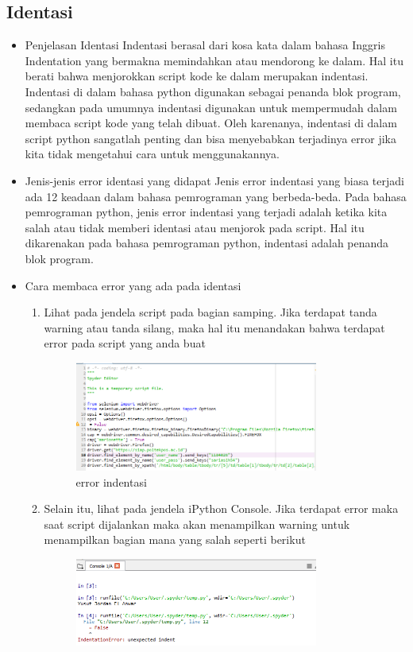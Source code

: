 \begin{enumerate}
\section{Identasi}
\begin{itemize}
	\item Penjelasan Identasi
		Indentasi berasal dari kosa kata dalam bahasa Inggris Indentation yang bermakna memindahkan atau mendorong ke dalam. Hal itu berati bahwa menjorokkan script kode ke dalam merupakan indentasi. Indentasi di dalam bahasa python digunakan sebagai penanda blok program, sedangkan pada umumnya indentasi digunakan untuk mempermudah dalam membaca script kode yang telah dibuat. Oleh karenanya, indentasi di dalam script python sangatlah penting dan bisa menyebabkan terjadinya error jika kita tidak mengetahui cara untuk menggunakannya.
	\item Jenis-jenis error identasi yang didapat
			Jenis error indentasi yang biasa terjadi ada 12 keadaan dalam bahasa pemrograman yang berbeda-beda. Pada bahasa pemrograman python, jenis error indentasi yang terjadi adalah ketika kita salah atau tidak memberi identasi atau menjorok pada script. Hal itu dikarenakan pada bahasa pemrograman python, indentasi adalah penanda blok program.
	\item Cara membaca error yang ada pada identasi
	\begin{enumerate}
	\item Lihat pada jendela script pada bagian samping. Jika terdapat tanda warning atau tanda silang, maka hal itu menandakan bahwa terdapat error pada script yang anda buat
			\begin{figure}[H]
			\includegraphics[width=8cm]{figures/1184026/eror/1.png}
			\centering
			\caption{error indentasi}
			\end{figure}
	\item Selain itu, lihat pada jendela iPython Console. Jika terdapat error maka saat script dijalankan maka akan menampilkan warning untuk menampilkan bagian mana yang salah seperti berikut
			\begin{figure}[H]
			\includegraphics[width=8cm]{figures/1184026/eror/2.png}

\end{figure}
\end{enumerate}
\end{itemize}
\end{enumerate}
